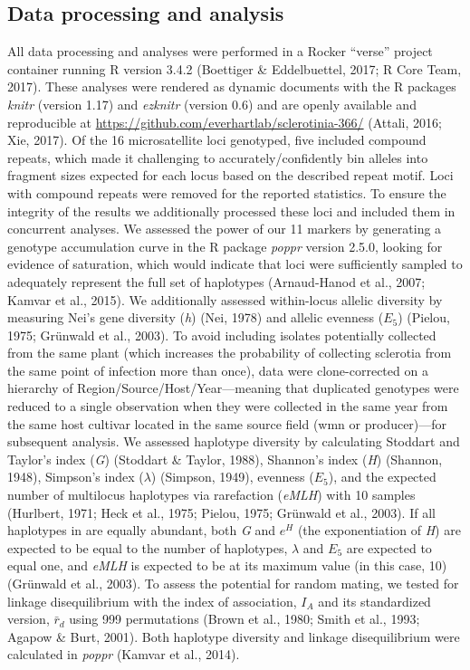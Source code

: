 \subsection*{Data processing and
analysis}\label{data-processing-and-analysis}

All data processing and analyses were performed in a Rocker ``verse''
project container running R version 3.4.2 (Boettiger \& Eddelbuettel,
2017; R Core Team, 2017). These analyses were rendered as dynamic
documents with the R packages \emph{knitr} (version 1.17) and
\emph{ezknitr} (version 0.6) and are openly available and reproducible
at \url{https://github.com/everhartlab/sclerotinia-366/} (Attali, 2016;
Xie, 2017). Of the 16 microsatellite loci genotyped, five included
compound repeats, which made it challenging to accurately/confidently
bin alleles into fragment sizes expected for each locus based on the
described repeat motif. Loci with compound repeats were removed for the
reported statistics. To ensure the integrity of the results we
additionally processed these loci and included them in concurrent
analyses. We assessed the power of our 11 markers by generating a
genotype accumulation curve in the R package \emph{poppr} version 2.5.0,
looking for evidence of saturation, which would indicate that loci were
sufficiently sampled to adequately represent the full set of haplotypes
(Arnaud-Hanod et al., 2007; Kamvar et al., 2015). We additionally
assessed within-locus allelic diversity by measuring Nei's gene
diversity (\emph{h}) (Nei, 1978) and allelic evenness (\(E_5\)) (Pielou,
1975; Grünwald et al., 2003). To avoid including isolates potentially
collected from the same plant (which increases the probability of
collecting sclerotia from the same point of infection more than once),
data were clone-corrected on a hierarchy of
Region/Source/Host/Year---meaning that duplicated genotypes were reduced
to a single observation when they were collected in the same year from
the same host cultivar located in the same source field (wmn or
producer)---for subsequent analysis. We assessed haplotype diversity by
calculating Stoddart and Taylor's index (\emph{G}) (Stoddart \& Taylor,
1988), Shannon's index (\emph{H}) (Shannon, 1948), Simpson's index
(\(\lambda\)) (Simpson, 1949), evenness (\(E_5\)), and the expected
number of multilocus haplotypes via rarefaction (\emph{eMLH}) with 10
samples (Hurlbert, 1971; Heck et al., 1975; Pielou, 1975; Grünwald et
al., 2003). If all haplotypes in are equally abundant, both \emph{G} and
\(e^H\) (the exponentiation of \emph{H}) are expected to be equal to the
number of haplotypes, \(\lambda\) and \(E_5\) are expected to equal one,
and \emph{eMLH} is expected to be at its maximum value (in this case,
10) (Grünwald et al., 2003). To assess the potential for random mating,
we tested for linkage disequilibrium with the index of association,
\(I_A\) and its standardized version, \(\bar{r}_d\) using 999
permutations (Brown et al., 1980; Smith et al., 1993; Agapow \& Burt,
2001). Both haplotype diversity and linkage disequilibrium were
calculated in \emph{poppr} (Kamvar et al., 2014).

